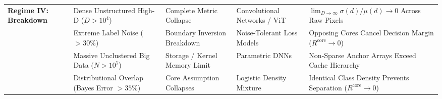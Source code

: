 \documentclass[preprint,review,12pt]{elsarticle}
\begin{document}
\begin{table}[!htbp]
{\begin{tabular}{lllll}
\midrule
\textbf{Regime IV: Breakdown} & Dense Unstructured High-D ($D > 10^4$) & Complete Metric Collapse & Convolutional Networks / ViT & $\lim_{D \to \infty} \sigma(d)/\mu(d) \to 0$ Across Raw Pixels \\
& Extreme Label Noise ($> 30\%$) & Boundary Inversion Breakdown & Noise-Tolerant Loss Models & Opposing Cores Cancel Decision Margin ($R^{\mathrm{core}} \to 0$) \\
& Massive Unclustered Big Data ($N > 10^7$) & Storage / Kernel Memory Limit & Parametric DNNs & Non-Sparse Anchor Arrays Exceed Cache Hierarchy \\
& Distributional Overlap (Bayes Error $> 35\%$) & Core Assumption Collapses & Logistic Density Mixture & Identical Class Density Prevents Separation ($R^{\mathrm{core}} \to 0$) \\
\bottomrule
\end{tabular}
}
\end{table}
\end{document}
